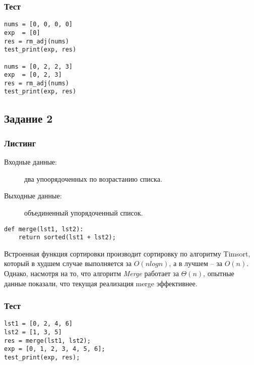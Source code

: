 \documentclass[12pt, a4paper] {ncc}
\begin{document}
        \subsubsection{Тест}

        \begin{lstlisting}
nums = [0, 0, 0, 0]
exp  = [0]
res = rm_adj(nums)
test_print(exp, res)

nums = [0, 2, 2, 3]
exp  = [0, 2, 3]
res = rm_adj(nums)
test_print(exp, res)
        \end{lstlisting}

    \subsection{Задание 2}

        \subsubsection{Листинг}
        \begin{description}
            \item[Входные данные:] два упоорядоченных по возрастанию списка.
            \item[Выходные данные:] объединенный упорядоченный список. 
        \end{description}

        \begin{lstlisting}
def merge(lst1, lst2):
    return sorted(lst1 + lst2);
        \end{lstlisting}
    Встроенная функция сортировки производит сортировку по алгоритму Timsort, который
    в худшем случае выполняется за $O(n log n)$, а в лучшем -- за $O(n)$. Однако, насмотря
    на то, что алгоритм \textit{Merge} работает за $\Theta(n)$, опытные данные показали,
    что текущая реализация merge эффективнее.

        \subsubsection{Тест}

        \begin{lstlisting}
lst1 = [0, 2, 4, 6]
lst2 = [1, 3, 5]
res = merge(lst1, lst2);
exp = [0, 1, 2, 3, 4, 5, 6];
test_print(exp, res);
        \end{lstlisting}
\end{document}
